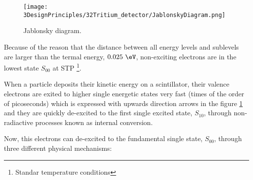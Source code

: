 \begin{figure}[htbp]
\centering
\texttt{[image: 3DesignPrinciples/32Tritium\_detector/JablonskyDiagram.png]}
\caption{Jablonsky diagram.\label{fig:JablonskyDiagram}~\cite{Knoll}}
\end{figure}

Because of the reason that the distance between all energy levels and sublevels are larger than the termal energy, $0.025~\eV$, non-exciting electrons are in the lowest state $S_{00}$ at STP \footnote{Standar temperature conditions}.

When a particle deposits their kinetic energy on a scintillator, their valence electrons are exited to higher single energetic states very fast (times of the order of picoseconds) which is expressed with upwards direction arrows in the figure \ref{fig:JablonskyDiagram} and they are quickly de-excited to the first single excited state, $S_{10}$, through non-radiactive processes known as internal conversion.

Now, this electrons can de-excited to the fundamental single state, $S_{00}$, through three different physical mechanisms:

